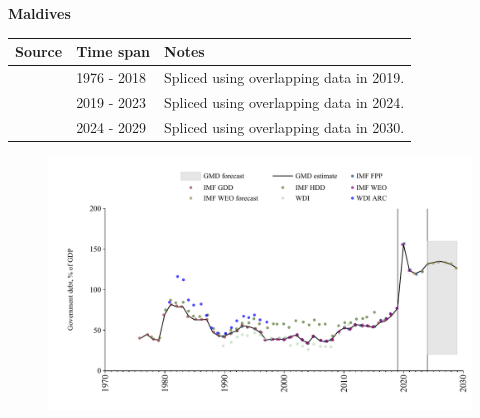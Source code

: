 \documentclass[12pt,a4paper,landscape]{article}
\begin{document}
\begin{adjustbox}{max totalsize={\paperwidth}{\paperheight},center}
\begin{minipage}[t][\textheight][t]{\textwidth}
\vspace*{0.5cm}
{}
\begin{center}
{\Large\bfseries Maldives}
\end{center}
\vspace{0.5cm}
\begin{table}[H]
\centering
\small
\begin{tabular}{|l|l|l|}
\hline
\textbf{Source} & \textbf{Time span} & \textbf{Notes} \\
\hline
\rowcolor{white}\cite{IMF_GDD}& 1976 - 2018 &Spliced using overlapping data in 2019.\\
\rowcolor{lightgray}\cite{IMF_FPP}& 2019 - 2023 &Spliced using overlapping data in 2024.\\
\rowcolor{white}\cite{IMF_WEO_forecast}& 2024 - 2029 &Spliced using overlapping data in 2030.\\
\hline
\end{tabular}
\end{table}
\begin{figure}[H]
\centering
\includegraphics[width=\textwidth,height=0.6\textheight,keepaspectratio]{graphs/MDV_govdebt_GDP.pdf}
\end{figure}
\end{minipage}
\end{adjustbox}
\end{document}
